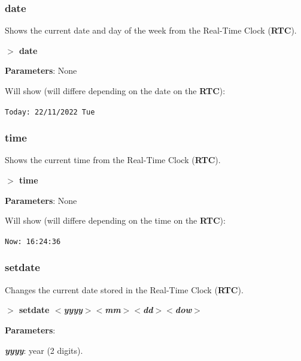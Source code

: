 \documentclass[a4paper,11pt]{article}
\begin{document}
        \subsubsection{{\color{blue}date}}
        Shows the current date and day of the week from the Real-Time Clock
        (\textbf{RTC}).

        \hspace{1.9cm}\textbf{$>$ date}

        \textbf{Parameters}: None

        Will show (will differe depending on the date on the \textbf{RTC}):

        \hspace{1cm}\texttt{Today:\ 22/11/2022 Tue}

        \subsubsection{{\color{blue}time}}
        Shows the current time from the Real-Time Clock (\textbf{RTC}).

        \hspace{1.9cm}\textbf{$>$ time}

        \textbf{Parameters}: None

        Will show (will differe depending on the time on the \textbf{RTC}):

        \hspace{1cm}\texttt{Now:\ 16:24:36}

        \subsubsection{{\color{blue}setdate}}
        Changes the current date stored in the Real-Time Clock (\textbf{RTC}).

        \hspace{1.9cm}\textbf{$>$ setdate \textit{$<$yyyy$>$$<$mm$>$$<$dd$>$$<$dow$>$}}

        \textbf{Parameters}:

        \hspace{1cm}\textbf{\textit{yyyy}}: year (2 digits).
\end{document}
